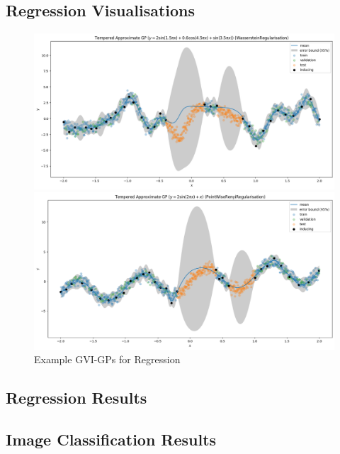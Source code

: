\documentclass{article}
\numberwithin{equation}{section}
\begin{document}
\subsection{Regression Visualisations}
\begin{figure}[h!]
\centering
\begin{minipage}{.5\textwidth}
  \centering
  \includegraphics[width=0.9\linewidth]{experiments/regression/toy_curves/outputs/curve3/tempered-WassersteinRegularisation.png}
\end{minipage}%
\begin{minipage}{.5\textwidth}
  \centering
  \includegraphics[width=0.9\linewidth]{experiments/regression/toy_curves/outputs/curve4/tempered-PointWiseRenyiRegularisation.png}
\end{minipage}
\caption{Example GVI-GPs for Regression}
\end{figure}
\subsection{Regression Results}

\subsection{Image Classification Results}
\end{document}
